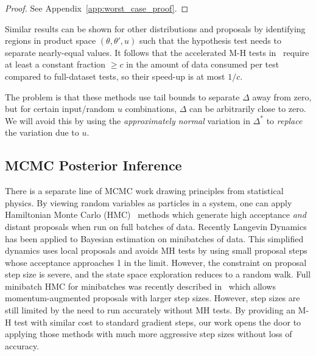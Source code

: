 \documentclass{article}
\begin{document}
\begin{proof}
See Appendix~\ref{app:worst_case_proof}.
\end{proof}

Similar results can be shown for other distributions and proposals by
identifying regions in product space $(\theta,\theta',u)$ such that the
hypothesis test needs to separate nearly-equal values.  It follows that the
accelerated M-H tests in~\cite{cutting_mh_2014,icml2014c1_bardenet14} require at
least a constant fraction $\geq c$ in the amount of data consumed per test
compared to full-dataset tests, so their speed-up is at most $1/c$.


The problem is that these methods use tail bounds to separate $\Delta$ away
from zero, but for certain input/random $u$ combinations, $\Delta$ can be
arbitrarily close to zero. We will avoid this by using the {\em approximately
normal} variation in $\Delta^*$ to {\em replace} the variation due to $u$. 

\subsection{MCMC Posterior Inference}
There is a separate line of MCMC work drawing principles from statistical
physics. By viewing random variables as particles in a system, one can apply
Hamiltonian Monte Carlo (HMC)~\cite{mcmc_hamiltonian_2010} methods which
generate high acceptance \emph{and} distant proposals when run on full batches
of data. Recently Langevin Dynamics~\cite{langevin_2011,conf/icml/AhnBW12} has
been applied to Bayesian estimation on minibatches of data. This simplified
dynamics uses local proposals and avoids MH tests by using small proposal steps
whose acceptance approaches 1 in the limit. However, the constraint on proposal
step size is severe, and the state space exploration reduces to a random walk.
Full minibatch HMC for minibatches was recently described in~\cite{sghmc_2014}
which allows momentum-augmented proposals with larger step sizes. However, step
sizes are still limited by the need to run accurately without MH tests.  By providing
an M-H test with similar cost to standard gradient steps, our
work opens the door to applying those methods with much more aggressive step
sizes without loss of accuracy. 
\end{document}
